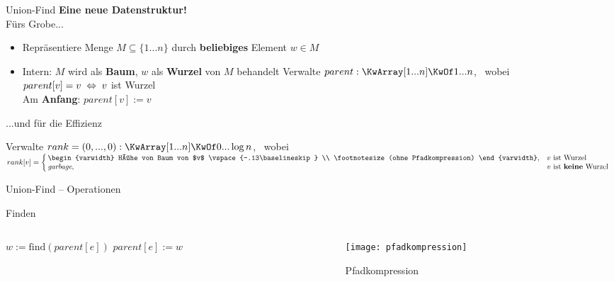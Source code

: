 \begin{frame}{Union-Find}
	\textbf{\impl Eine neue Datenstruktur!} \\
	Fürs Grobe...
	\begin{itemize}
		\item Repräsentiere Menge $M \subseteq \{1...n\}$ durch \textbf{beliebiges} Element $w \in M$
		\pause
		\item Intern: $M$ wird als \textbf{Baum}, $w$ als \textbf{Wurzel} von $M$ behandelt
		\pause
		\implitem Verwalte $parent: \KwArray[1...n] \KwOf 1...n$, \ wobei \\
		$parent[v] = v \gdw v$ ist Wurzel \\ Am \textbf{Anfang}: $parent[v] := v$  \\
		\visible<3->{\texttt{[image: init]}}
	\end{itemize}
	\pause
	...und für die Effizienz
	\begin{itemize}
		\implitem Verwalte $rank = (0,...,0) : \KwArray[1...n] \KwOf 0 ...\log n$, \ wobei \\
		$rank[v] = \casesl{
			\begin{varwidth}{\linewidth} Höhe von Baum von $v$ \vspace{-.13\baselineskip} \\ \footnotesize (ohne Pfadkompression) \end{varwidth},
				& \text{$v$ ist Wurzel} \\
			\textit{garbage}, 
				& \text{$v$ ist \textbf{keine} Wurzel}}$
	\end{itemize}
\end{frame}

\begin{frame}{Union-Find – Operationen}
	\begin{exampleblock}{Finden}
		\begin{columns}[T] 
			\begin{column}[T]{.5\linewidth} 
				\begin{algorithm}[H]
					 {
						 {
							\;
						} {
							$w := \text{find}(parent[e])$\;
							 \;
							$parent[e] := w$\;
							\;
						}
					}
				\end{algorithm}
			\end{column}
			\begin{column}[T]{.4\linewidth} 
				\bigskip
				\begin{figure}[b]
					\centering
					\texttt{[image: pfadkompression]}
					\caption{Pfadkompression}
				\end{figure}
			\end{column}
		\end{columns}
	\end{exampleblock}
\end{frame}


